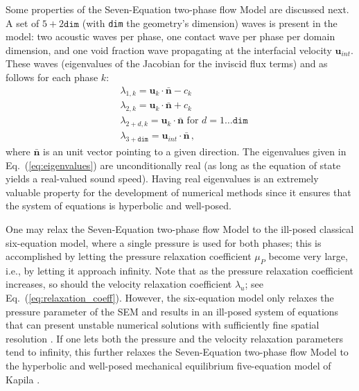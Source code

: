 \documentclass[preprint,10pt]{elsarticle}
\newcommand{\mbold}[1]{\boldsymbol#1}
\newcommand{\eqt}[1]{Eq.~(\ref{#1})}                     %
\begin{document}
Some properties of the Seven-Equation two-phase flow Model are discussed next. A set of $5+2\texttt{dim}$ (with \texttt{dim} the geometry's dimension) waves is present in the model: two acoustic waves per phase, one contact wave per phase per domain dimension, and one void fraction wave propagating at the interfacial velocity $\mbold u_{int}$. These waves (eigenvalues of the Jacobian for the inviscid flux terms) and as follows for each phase $k$:
% 
\begin{align}\label{eq:eigenvalues}
&\lambda_{1,k} = \mbold u_k \cdot \bar{\mbold n} - c_k \nonumber\\
&\lambda_{2,k} = \mbold u_k \cdot \bar{\mbold n} + c_k \nonumber\\
&\lambda_{2+d,k} = \mbold u_k \cdot \bar{\mbold n} \text{ for } d = 1 \dots \texttt{dim} \\
&\lambda_{3+\texttt{dim}} = \mbold u_{int} \cdot \bar{\mbold n} \nonumber \,,
\end{align}
%
where $\bar{\mbold n}$ is an unit vector pointing to a given direction. The eigenvalues given in \eqt{eq:eigenvalues} are unconditionally real (as long as the equation of state yields a real-valued sound speed). Having real eigenvalues is an extremely valuable property for the development of numerical methods since it ensures that the system of equations is hyperbolic and well-posed. 

One may relax the Seven-Equation two-phase flow Model to
the ill-posed classical six-equation model, where a single pressure 
is used for both phases; this is
accomplished by letting the pressure relaxation coefficient $\mu_P$ become
very large, i.e., by letting it approach infinity.  Note that as the pressure
relaxation coefficient increases, so should the velocity
relaxation coefficient $\lambda_u$; see \eqt{eq:relaxation_coeff}. 
However, the six-equation model only relaxes the pressure parameter of the SEM and results
in an ill-posed system of equations that can present unstable numerical solutions
with sufficiently fine spatial resolution \cite{SEM,Herrard_2005}. 
%
If one lets both the pressure and the velocity relaxation parameters tend to infinity, this further relaxes the
Seven-Equation two-phase flow Model to the hyperbolic and well-posed 
mechanical equilibrium five-equation model of Kapila \cite{Kapila_2001}.  
\end{document}
